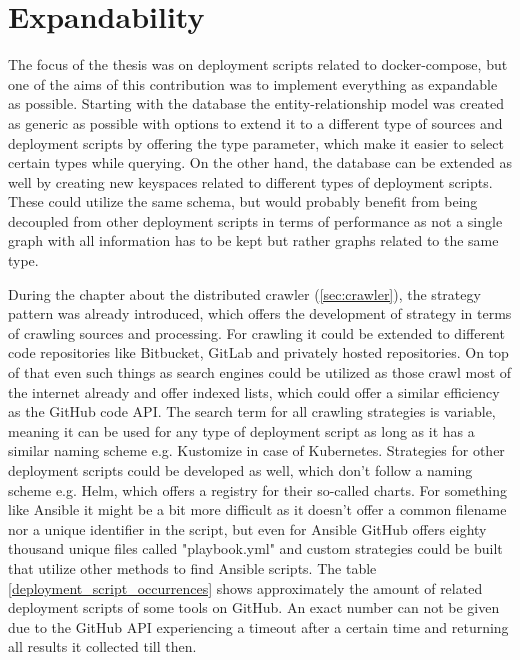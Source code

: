 \section{Expandability}
\label{sec:expandability}
The focus of the thesis was on deployment scripts related to docker-compose, but one of the aims of this contribution was to implement everything as expandable as possible.
Starting with the database the entity-relationship model was created as generic as possible with options to extend it to a different type of sources and deployment scripts by offering the type parameter, which make it easier to select certain types while querying. On the other hand, the database can be extended as well by creating new keyspaces related to different types of deployment scripts. These could utilize the same schema, but would probably benefit from being decoupled from other deployment scripts in terms of performance as not a single graph with all information has to be kept but rather graphs related to the same type.

During the chapter about the distributed crawler (\ref{sec:crawler}), the strategy pattern was already introduced, which offers the development of strategy in terms of crawling sources and processing.
For crawling it could be extended to different code repositories like Bitbucket, GitLab and privately hosted repositories. On top of that even such things as search engines could be utilized as those crawl most of the internet already and offer indexed lists, which could offer a similar efficiency as the GitHub code API. The search term for all crawling strategies is variable, meaning it can be used for any type of deployment script as long as it has a similar naming scheme e.g. Kustomize in case of Kubernetes. Strategies for other deployment scripts could be developed as well, which don't follow a naming scheme e.g. Helm, which offers a registry for their so-called charts. For something like Ansible it might be a bit more difficult as it doesn't offer a common filename nor a unique identifier in the script, but even for Ansible GitHub offers eighty thousand unique files called "playbook.yml" and custom strategies could be built that utilize other methods to find Ansible scripts. The table \ref{deployment_script_occurrences} shows approximately the amount of related deployment scripts of some tools on GitHub. An exact number can not be given due to the GitHub API experiencing a timeout after a certain time and returning all results it collected till then.

